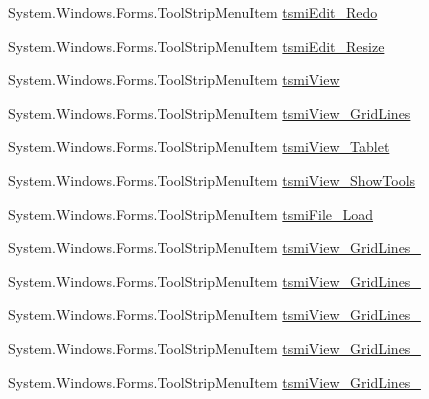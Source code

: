 \begin{DoxyCompactItemize}
\item 
System.\+Windows.\+Forms.\+Tool\+Strip\+Menu\+Item \mbox{\hyperlink{class_paint___program_1_1_form1_ab8e2071c6763b0d0f4b1e001ea4eca97}{tsmi\+Edit\+\_\+\+Redo}}
\item 
System.\+Windows.\+Forms.\+Tool\+Strip\+Menu\+Item \mbox{\hyperlink{class_paint___program_1_1_form1_ab77fd9bb3a148f2228e9390c335c8350}{tsmi\+Edit\+\_\+\+Resize}}
\item 
System.\+Windows.\+Forms.\+Tool\+Strip\+Menu\+Item \mbox{\hyperlink{class_paint___program_1_1_form1_aa47b36feef8f0c4044d1c915d432101b}{tsmi\+View}}
\item 
System.\+Windows.\+Forms.\+Tool\+Strip\+Menu\+Item \mbox{\hyperlink{class_paint___program_1_1_form1_a32396689630f95eabe9f3e3914a6c2ff}{tsmi\+View\+\_\+\+Grid\+Lines}}
\item 
System.\+Windows.\+Forms.\+Tool\+Strip\+Menu\+Item \mbox{\hyperlink{class_paint___program_1_1_form1_a8496cdee36ebcee5fae22a0ed4a170c0}{tsmi\+View\+\_\+\+Tablet}}
\item 
System.\+Windows.\+Forms.\+Tool\+Strip\+Menu\+Item \mbox{\hyperlink{class_paint___program_1_1_form1_a5d228e9401c7b3eb0b03b81902a1c093}{tsmi\+View\+\_\+\+Show\+Tools}}
\item 
System.\+Windows.\+Forms.\+Tool\+Strip\+Menu\+Item \mbox{\hyperlink{class_paint___program_1_1_form1_a1c4264970c7dfc2e7e6a5ddecf313a01}{tsmi\+File\+\_\+\+Load}}
\item 
System.\+Windows.\+Forms.\+Tool\+Strip\+Menu\+Item \mbox{\hyperlink{class_paint___program_1_1_form1_ad57fefbd2c72c51d4f3b391287465070}{tsmi\+View\+\_\+\+Grid\+Lines\+\_}}
\item 
System.\+Windows.\+Forms.\+Tool\+Strip\+Menu\+Item \mbox{\hyperlink{class_paint___program_1_1_form1_a9f8d9310f0eae551d4e02b7843c22c49}{tsmi\+View\+\_\+\+Grid\+Lines\+\_}}
\item 
System.\+Windows.\+Forms.\+Tool\+Strip\+Menu\+Item \mbox{\hyperlink{class_paint___program_1_1_form1_a7d636a28dc51b8752209f4e216617bee}{tsmi\+View\+\_\+\+Grid\+Lines\+\_}}
\item 
System.\+Windows.\+Forms.\+Tool\+Strip\+Menu\+Item \mbox{\hyperlink{class_paint___program_1_1_form1_a51ddd4774c153fe7112ce4fa78573d30}{tsmi\+View\+\_\+\+Grid\+Lines\+\_}}
\item 
System.\+Windows.\+Forms.\+Tool\+Strip\+Menu\+Item \mbox{\hyperlink{class_paint___program_1_1_form1_a37d5f3e273efa112f8b79d3a13676130}{tsmi\+View\+\_\+\+Grid\+Lines\+\_}}
\item 

\end{DoxyCompactItemize}
